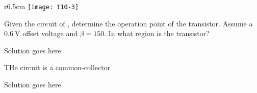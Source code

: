 \documentclass[10pt,a4paper]{memoir}
\begin{document}
\newpage
\begin{question}
  \begin{wrapfigure}{r}{6.5cm}
    \centering
    \texttt{[image: t10-3]}
    \caption{}
    \label{fig:t10-3}
  \end{wrapfigure}
  Given the circuit of , determine the operation point of the transistor. Assume a $\SI{0.6}{\volt}$ offset voltage and $\beta = 150$. In what region is the transistor?
\end{question}
\begin{solution}
  Solution goes here
\end{solution}

\newpage
\begin{question}
THe circuit is a common-collector
\end{question}
\begin{solution}
  Solution goes here
\end{solution}
\end{document}
